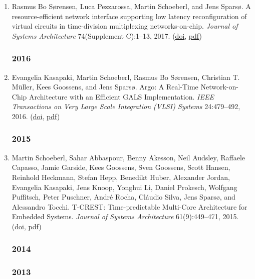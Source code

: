 \begin{enumerate}
\item Rasmus Bo S{\o}rensen, Luca Pezzarossa, Martin Schoeberl, and Jens Spars{\o}.
 A resource-efficient network interface supporting low latency reconfiguration of virtual circuits in time-division multiplexing networks-on-chip.
 \emph{Journal of Systems Architecture} 74(Supplement C):1--13, 2017.
(\href{http://dx.doi.org/10.1016/j.sysarc.2017.02.001}{doi}, \href{http://www.jopdesign.com/doc/argo2.pdf}{pdf})


\subsubsection*{2016}

\item Evangelia Kasapaki, Martin Schoeberl, Rasmus Bo S{\o}rensen, Christian T. M\"uller, Kees Goossens, and Jens Spars{\o}.
 Argo: A Real-Time Network-on-Chip Architecture with an Efficient GALS Implementation.
 \emph{IEEE Transactions on Very Large Scale Integration (VLSI) Systems} 24:479--492, 2016.
(\href{http://dx.doi.org/10.1109/TVLSI.2015.2405614}{doi}, \href{http://www.jopdesign.com/doc/argo-jnl.pdf}{pdf})


\subsubsection*{2015}

\item Martin Schoeberl, Sahar Abbaspour, Benny Akesson, Neil Audsley, Raffaele Capasso, Jamie Garside, Kees Goossens, Sven Goossens, Scott Hansen, Reinhold Heckmann, Stefan Hepp, Benedikt Huber, Alexander Jordan, Evangelia Kasapaki, Jens Knoop, Yonghui Li, Daniel Prokesch, Wolfgang Puffitsch, Peter Puschner, Andr\'{e} Rocha, Cl\'{a}udio Silva, Jens Spars{\o}, and Alessandro Tocchi.
 T-CREST: Time-predictable Multi-Core Architecture for Embedded Systems.
 \emph{Journal of Systems Architecture} 61(9):449--471, 2015.
(\href{http://dx.doi.org/10.1016/j.sysarc.2015.04.002}{doi}, \href{http://www.jopdesign.com/doc/t-crest-jnl.pdf}{pdf})


\subsubsection*{2014}


\subsubsection*{2013}


\end{enumerate}
